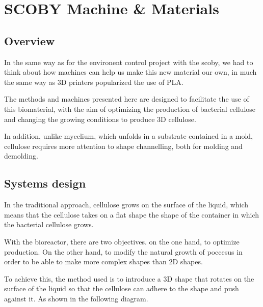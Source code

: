 \chapter{SCOBY Machine \& Materials}


\section{Overview}

In the same way as for the environent control project with the scoby, we had to think about how machines can help us make this new material our own, in much the same way as 3D printers popularized the use of PLA. 

The methods and machines presented here are designed to facilitate the use of this biomaterial, with the aim of optimizing the production of bacterial cellulose and changing the growing conditions to produce 3D cellulose. 

In addition, unlike mycelium, which unfolds in a substrate contained in a mold, cellulose requires more attention to shape channelling, both for molding and demolding. 


\section{Systems design}


In the traditional approach, cellulose grows on the surface of the liquid, which means that the cellulose takes on a flat shape \- the shape of the container in which the bacterial cellulose grows. 

With the bioreactor, there are two objectives. on the one hand, to optimize production. On the other hand, to modify the natural growth of poccesus in order to be able to make more complex shapes than 2D shapes. 

To achieve this, the method used is to introduce a 3D shape that rotates on the surface of the liquid so that the cellulose can adhere to the shape and push against it. As shown in the following diagram. 

